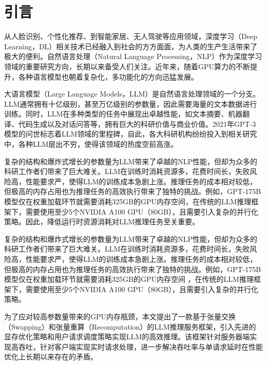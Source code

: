 \section{引言}

从人脸识别\cite{Face-Recognition}、个性化推荐\cite{Personal-Recommendation}、到智能家居\cite{Smart-Home}、无人驾驶\cite{Self-Driving-Car}等应用领域，深度学习\cite{Deep-Learning}（Deep Learning，DL）相关技术已经融入到社会的方方面面，为人类的生产生活带来了极大的便利。自然语言处理\cite{NLP}（Natural Language Processing，NLP）作为深度学习领域的重要研究方向，长期以来备受人们关注。近年来，随着GPU算力的不断提升，各种语言模型也朝着复杂化，多功能化的方向迅猛发展。 
\par
大语言模型\cite{LLM}（Large Language Models，LLM）是自然语言处理领域的一个分支。LLM通常拥有十亿级别，甚至万亿级别的参数量，因此需要海量的文本数据进行训练。同时，LLM在多种类型的任务中展现出卓越性能，如文本摘要\cite{Text-Summarization}、机器翻译\cite{Machine-Translation}、代码生成\cite{Code-Generation}以及对话问答\cite{Question-Answer}等，拥有巨大的科研价值与商业价值。2021年GPT-3模型\cite{Text-Summarization, GPT3}的问世标志着LLM领域的里程碑，自此，各大科研机构纷纷投入到相关研究中，各种LLM层出不穷，使得该领域的热度空前高涨。 
\par
复杂的结构和爆炸式增长的参数量为LLM带来了卓越的NLP性能，但却为众多的科研工作者们带来了巨大难关。LLM在训练时消耗资源多，花费时间长，失败风险高，性能要求严，使得LLM的训练成本急剧上涨。推理任务的成本相对较低，但极高的内存占用也为推理任务的高效执行带来了独特的挑战。例如，GPT-175B模型仅在权重加载环节就需要消耗325GB的GPU内存空间\cite{GPT-175B资源消耗}，在传统的LLM推理框架下，需要使用至少5个NVIDIA A100 GPU（80GB），且需要引入复杂的并行化策略。因此，降低运行时资源消耗对LLM推理任务至关重要。
\par
复杂的结构和爆炸式增长的参数量为LLM带来了卓越的NLP性能，但却为众多的科研工作者们带来了巨大难关。LLM在训练时消耗资源多，花费时间长，失败风险高，性能要求严，使得LLM的训练成本急剧上涨。推理任务的成本相对较低，但极高的内存占用也为推理任务的高效执行带来了独特的挑战。例如，GPT-175B模型仅在权重加载环节就需要消耗325GB的GPU内存空间 ，在传统的LLM推理框架下，需要使用至少5个NVIDIA A100 GPU（80GB），且需要引入复杂的并行化策略。
\par
为了应对较高参数量带来的GPU内存瓶颈，本文提出了一款基于张量交换\cite{Swapping}（Swapping）和张量重算\cite{Recomputation}（Recomputation）的LLM推理服务框架，引入先进的显存优化策略和用户请求调度策略实现LLM的高效推理。该框架针对服务器端实现高吞吐，针对客户端实现实时请求处理，进一步解决吞吐率与单请求延时在性能优化上长期以来存在的矛盾。 

